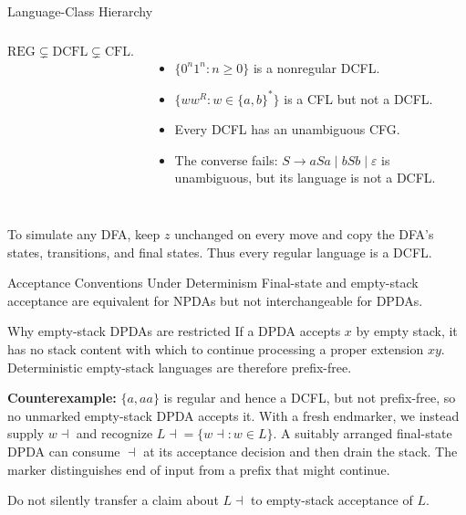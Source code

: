 \documentclass[10pt]{beamer}
\begin{document}
\begin{frame}{Language-Class Hierarchy}
  \small
  \begin{columns}[T]
    \centering

    \[
      \mathrm{REG}\subsetneq\mathrm{DCFL}\subsetneq\mathrm{CFL}.
    \]
    \begin{itemize}
      \item $\{0^n1^n:n\ge0\}$ is a nonregular DCFL.
      \item $\{ww^R:w\in\{a,b\}^*\}$ is a CFL but not a DCFL.
      \item Every DCFL has an unambiguous CFG.
      \item The converse fails: $S\to aSa\mid bSb\mid\varepsilon$ is
        unambiguous, but its language is not a DCFL.
    \end{itemize}
  \end{columns}
  \pause
  To simulate any DFA, keep $z$ unchanged on every move and copy the DFA's
  states, transitions, and final states. Thus every regular language is a DCFL.
\end{frame}


\begin{frame}{Acceptance Conventions Under Determinism}
  \small
  Final-state and empty-stack acceptance are equivalent for NPDAs but not interchangeable for DPDAs.
  \begin{block}{Why empty-stack DPDAs are restricted}
    If a DPDA accepts $x$ by empty stack, it has no stack content with which to continue processing a
    proper extension $xy$. Deterministic empty-stack languages are therefore prefix-free.
  \end{block}
  \textbf{Counterexample:} $\{a,aa\}$ is regular and hence a DCFL, but not
  prefix-free, so no unmarked empty-stack DPDA accepts it.
  \pause
  With a fresh endmarker, we instead supply $w\dashv$ and recognize
  $L\dashv=\{w\dashv:w\in L\}$. A suitably arranged final-state DPDA can
  consume $\dashv$ at its acceptance decision and then drain the stack.
  The marker distinguishes end of input from a prefix that might continue.
  \par\smallskip
  Do not silently transfer a claim about $L\dashv$ to empty-stack acceptance of $L$.
\end{frame}
\end{document}

